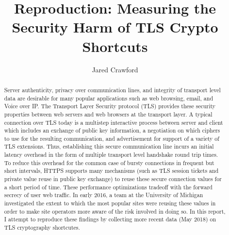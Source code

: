 \documentclass[sigconf]{acmart}
\begin{document}
\title{Reproduction: Measuring the Security Harm of TLS Crypto Shortcuts}


\author{Jared Crawford}

\renewcommand{\shortauthors}{Crawford}

\begin{abstract}
    Server authenticity, privacy over communication lines, and integrity of transport level data are desirable for many popular applications such as web browsing, email, and Voice over IP. The Transport Layer Security protocol (TLS) provides these security properties between web servers and web browsers at the transport layer. A typical connection over TLS today is a multistep interactive process between server and client which includes an exchange of public key information, a negotiation on which ciphers to use for the resulting communication, and advertisement for support of a variety of TLS extensions. Thus, establishing this secure communication line incurs an initial latency overhead in the form of multiple transport level handshake round trip times. \cite{RFC5077} To reduce this overhead for the common case of bursty connections in frequent but short intervals, HTTPS supports many mechanisms (such as TLS session tickets and private value reuse in public key exchange) to reuse these secure connection values for a short period of time. These performance optimizations tradeoff with the forward secrecy of user web traffic. In early 2016, a team at the University of Michigan investigated the extent to which the most popular sites were reusing these values in order to make site operators more aware of the risk involved in doing so\cite{Springall:2016:MSH:2987443.2987480}. In this report, I attempt to reproduce these findings by collecting more recent data (May 2018) on TLS cryptography shortcutes.
\end{abstract}

\maketitle





\end{document}

